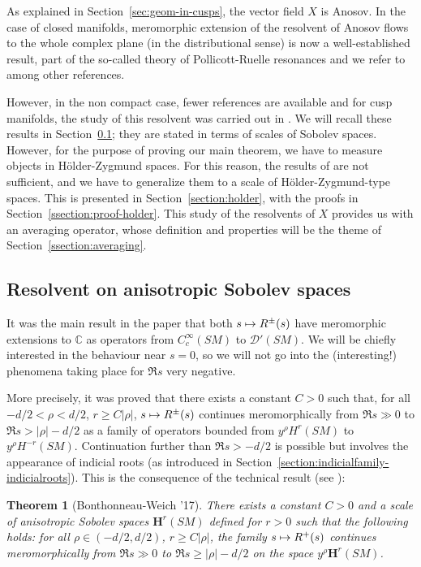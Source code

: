 \documentclass[10pt]{amsart}
\newcommand\mto{\mathchoice{\longmapsto}{\mapsto}{\mapsto}{\mapsto}}
\newcommand{\bH}{\boldsymbol{H}}
\newcommand{\C}{\mathbb{C}}
\theoremstyle{plain}
\newtheorem{theorem}{Theorem}[section]
\theoremstyle{definition}
\begin{document}
As explained in Section~\ref{sec:geom-in-cusps}, the vector field $X$ is Anosov. In the case of closed manifolds, meromorphic extension of the resolvent of Anosov flows to the whole complex plane (in the distributional sense) is now a well-established result, part of the so-called theory of Pollicott-Ruelle resonances and we refer to \cite{Faure-Sjostrand-11,Giulietti-Liverani-Pollicott-13, Faure-Tsuji-13, Dyatlov-Zworski-16,Adam-Baladi-21} among other references.

However, in the non compact case, fewer references are available and for cusp manifolds, the study of this resolvent was carried out in \cite{Bonthonneau-Weich-17}. We will recall these results in Section~\ref{section:sobolev}; they are stated in terms of scales of Sobolev spaces. However, for the purpose of proving our main theorem, we have to measure objects in H\"older-Zygmund spaces. For this reason, the results of \cite{Bonthonneau-Weich-17} are not sufficient, and we have to generalize them to a scale of H\"older-Zygmund-type spaces. This is presented in Section~\ref{section:holder}, with the proofs in Section~\ref{ssection:proof-holder}. This study of the resolvents of $X$ provides us with an averaging operator, whose definition and properties will be the theme of Section~\ref{ssection:averaging}.

\subsection{Resolvent on anisotropic Sobolev spaces}
\label{section:sobolev}

It was the main result in the paper \cite{Bonthonneau-Weich-17} that both $s \mto R^\pm(s)$ have meromorphic extensions to $\C$ as operators from $C^\infty_c(SM)$ to $\mathcal{D}'(SM)$. We will be chiefly interested in the behaviour near $s=0$, so we will not go into the (interesting!) phenomena taking place for $\Re s$ very negative.

More precisely, it was proved that there exists a constant $C>0$ such that, for all $-d/2 < \rho < d/2$, $r\geq C|\rho|$, $s \mto R^\pm(s)$ continues meromorphically from $\Re s \gg 0$ to $\Re s > |\rho| - d/2$ as a family of operators bounded from $y^\rho H^r(SM)$ to $y^\rho H^{-r}(SM)$. Continuation further than $\Re s> -d/2$ is possible but involves the appearance of indicial roots (as introduced in Section~\ref{section:indicialfamily-indicialroots}). This is the consequence of the technical result (see \cite[Th.\,3 \& Lem.\,4.16]{Bonthonneau-Weich-17}):
\begin{theorem}[Bonthonneau-Weich '17]
\label{theorem:bw}
There exists a constant $C > 0$ and a scale of anisotropic Sobolev spaces $\bH^r(SM)$ defined for $r > 0$ such that the following holds: for all $\rho \in (-d/2,d/2)$, $r \geq C|\rho|$, the family $s \mto R^+(s)$ continues meromorphically from $\Re s \gg 0$ to $\Re s \geq |\rho|-d/2$ on the space $y^\rho \bH^r(SM)$.
\end{theorem}
\end{document}
